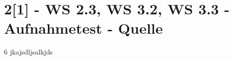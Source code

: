 \section{2[1] - WS 2.3, WS 3.2, WS 3.3 - Aufnahmetest - Quelle}

\begin{langesbeispiel}\item[6] %
jkajsdljsalkjds

\end{langesbeispiel}